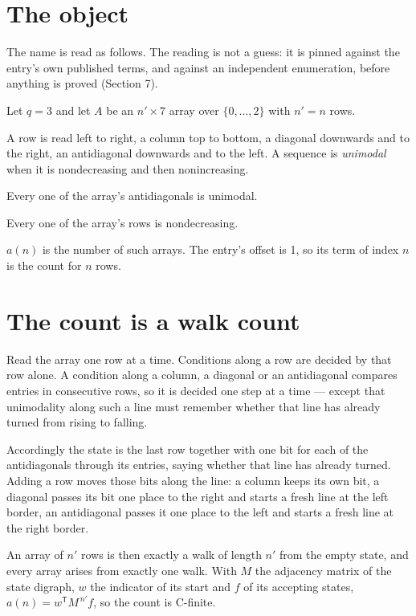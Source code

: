 \documentclass[11pt]{article}
\theoremstyle{definition}
\begin{document}
\section{The object}

The name is read as follows. The reading is not a guess: it is pinned against the entry's own published terms, and against an independent enumeration, before anything is proved (Section 7).

Let $q = 3$ and let $A$ be an $n' \times 7$ array over $\{0,\dots,2\}$ with $n' = n$ rows.

A row is read left to right, a column top to bottom, a diagonal downwards and to the right, an antidiagonal downwards and to the left. A sequence is {\itshape unimodal} when it is nondecreasing and then nonincreasing.

Every one of the array's antidiagonals is unimodal.

Every one of the array's rows is nondecreasing.

$a(n)$ is the number of such arrays. The entry's offset is 1, so its term of index $n$ is the count for $n$ rows.

\section{The count is a walk count}

Read the array one row at a time. Conditions along a row are decided by that row alone. A condition along a column, a diagonal or an antidiagonal compares entries in consecutive rows, so it is decided one step at a time --- except that unimodality along such a line must remember whether that line has already turned from rising to falling.

Accordingly the state is the last row together with one bit for each of the antidiagonals through its entries, saying whether that line has already turned. Adding a row moves those bits along the line: a column keeps its own bit, a diagonal passes its bit one place to the right and starts a fresh line at the left border, an antidiagonal passes it one place to the left and starts a fresh line at the right border.

An array of $n'$ rows is then exactly a walk of length $n'$ from the empty state, and every array arises from exactly one walk. With $M$ the adjacency matrix of the state digraph, $w$ the indicator of its start and $f$ of its accepting states, $a(n) = w^{\mathsf T}M^{\,n'}f$, so the count is C-finite.
\end{document}
